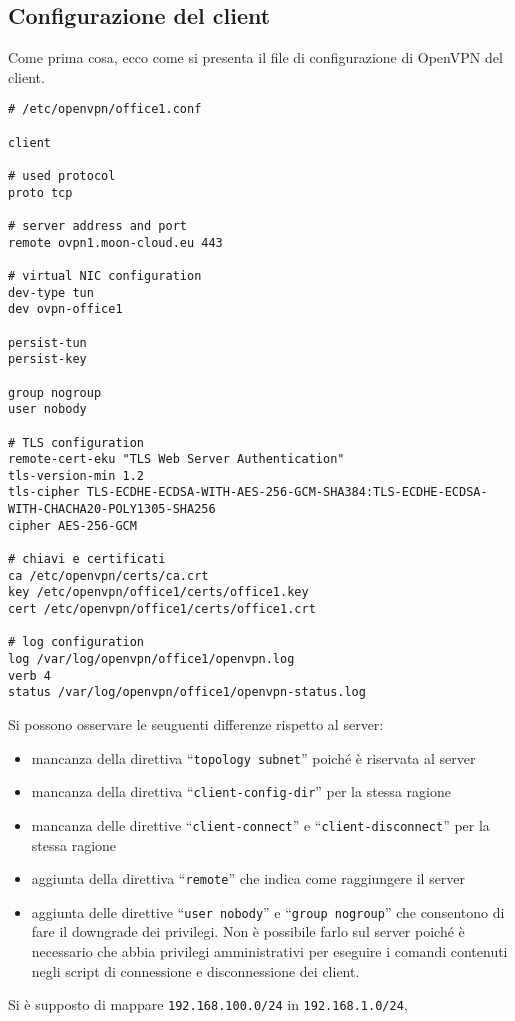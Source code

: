 \subsection{Configurazione del client}
Come prima cosa, ecco come si presenta il file di configurazione di OpenVPN
del client.
\begin{verbatim}
# /etc/openvpn/office1.conf

client

# used protocol
proto tcp

# server address and port
remote ovpn1.moon-cloud.eu 443

# virtual NIC configuration
dev-type tun
dev ovpn-office1

persist-tun
persist-key

group nogroup
user nobody

# TLS configuration
remote-cert-eku "TLS Web Server Authentication"
tls-version-min 1.2
tls-cipher TLS-ECDHE-ECDSA-WITH-AES-256-GCM-SHA384:TLS-ECDHE-ECDSA-WITH-CHACHA20-POLY1305-SHA256
cipher AES-256-GCM

# chiavi e certificati
ca /etc/openvpn/certs/ca.crt
key /etc/openvpn/office1/certs/office1.key
cert /etc/openvpn/office1/certs/office1.crt

# log configuration
log /var/log/openvpn/office1/openvpn.log
verb 4
status /var/log/openvpn/office1/openvpn-status.log
\end{verbatim}
Si possono osservare le seuguenti differenze rispetto al server:
\begin{itemize}
  \item mancanza della direttiva ``\texttt{topology subnet}'' poiché è
  riservata al server
  \item mancanza della direttiva ``\texttt{client-config-dir}'' per la stessa
  ragione
  \item mancanza delle direttive ``\texttt{client-connect}'' e
  ``\texttt{client-disconnect}'' per la stessa ragione
  \item aggiunta della direttiva ``\texttt{remote}'' che indica come raggiungere
  il server
  \item aggiunta delle direttive ``\texttt{user nobody}'' e ``\texttt{group nogroup}''
  che consentono di fare il downgrade dei privilegi. Non è possibile farlo sul
  server poiché è necessario che abbia privilegi amministrativi per eseguire i
  comandi contenuti negli script di connessione e disconnessione dei client.
\end{itemize}
Si è supposto di mappare \texttt{192.168.100.0/24} in \texttt{192.168.1.0/24},

